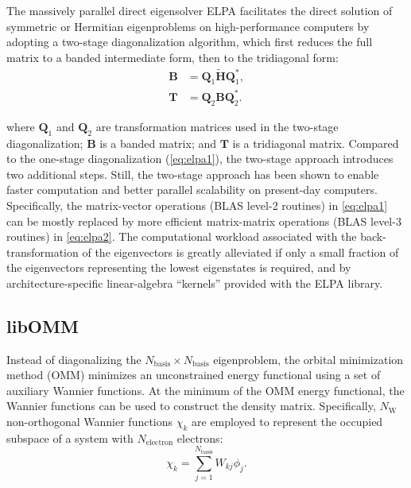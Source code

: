 \documentclass{report}
\begin{document}
The massively parallel direct eigensolver ELPA \cite{elpa_auckenthaler_2011,elpa_marek_2014} facilitates the direct solution of symmetric or Hermitian eigenproblems on high-performance computers by adopting a two-stage diagonalization algorithm, which first reduces the full matrix to a banded intermediate form, then to the tridiagonal form:\\
\begin{equation}
\label{eq:elpa2}
\begin{split}
\boldsymbol{B} & = \boldsymbol{Q}_1 \boldsymbol{\tilde{H}} \boldsymbol{Q}_1^* ,\\
\boldsymbol{T} & = \boldsymbol{Q}_2 \boldsymbol{B} \boldsymbol{Q}_2^* .
\end{split}
\end{equation}

where $\boldsymbol{Q}_1$ and $\boldsymbol{Q}_2$ are transformation matrices used in the two-stage diagonalization; $\boldsymbol{B}$ is a banded matrix; and $\boldsymbol{T}$ is a tridiagonal matrix.  Compared to the one-stage diagonalization (\ref{eq:elpa1}), the two-stage approach introduces two additional steps.  Still, the two-stage approach has been shown to enable faster computation and better parallel scalability on present-day computers.  Specifically, the matrix-vector operations (BLAS level-2 routines) in \ref{eq:elpa1} can be mostly replaced by more efficient matrix-matrix operations (BLAS level-3 routines) in \ref{eq:elpa2}.  The computational workload associated with the back-transformation of the eigenvectors is greatly alleviated if only a small fraction of the eigenvectors representing the lowest eigenstates is required, and by architecture-specific linear-algebra ``kernels'' provided with the ELPA library.\\

\subsection{libOMM}
\label{subsec:solvers_omm}
Instead of diagonalizing the $N_\text{basis} \times N_\text{basis}$ eigenproblem, the orbital minimization method (OMM) minimizes an unconstrained energy functional using a set of auxiliary Wannier functions.  At the minimum of the OMM energy functional, the Wannier functions can be used to construct the density matrix.  Specifically, $N_\text{W}$ non-orthogonal Wannier functions $\chi_k$ are employed to represent the occupied subspace of a system with $N_\text{electron}$ electrons:\\
\begin{equation}
\label{eq:wannier}
\chi_k = \sum_{j=1}^{N_\text{basis}} W_{kj} \phi_j .
\end{equation}
\end{document}
